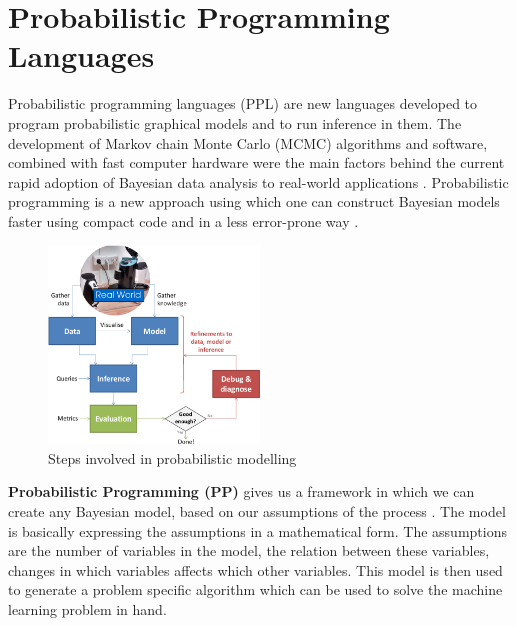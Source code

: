 \section{Probabilistic Programming Languages}

Probabilistic programming languages (PPL) are new languages developed to program probabilistic graphical models and to run inference in them. The development of Markov chain Monte Carlo  (MCMC) algorithms and software, combined with fast computer hardware were the main factors behind the current rapid adoption of Bayesian data analysis to real-world applications \citep{kruschke2014doing}. Probabilistic programming is a new approach using which one can construct Bayesian models faster using compact code and in a less error-prone way \citep{dippl, luttinen_bayespy_2014}. 


\begin{figure}[htp]
\centering
\includegraphics[width=0.5\textwidth]{pictures/Lifecycle.png}
\caption[Steps involved in probabilistic modelling ]{Steps involved in probabilistic modelling  \cite{winn2016} }
\label{}
\end{figure}


\textbf{Probabilistic Programming  (PP)} gives us a framework in which we can create any Bayesian model, based on our assumptions of the process \cite{winn2016}. The model is basically expressing the assumptions in a mathematical form. The assumptions are the number of variables in the model, the relation between these variables, changes in which variables affects which other variables. This model is then used to generate a problem specific algorithm which can be used to solve the machine learning problem in hand. 

